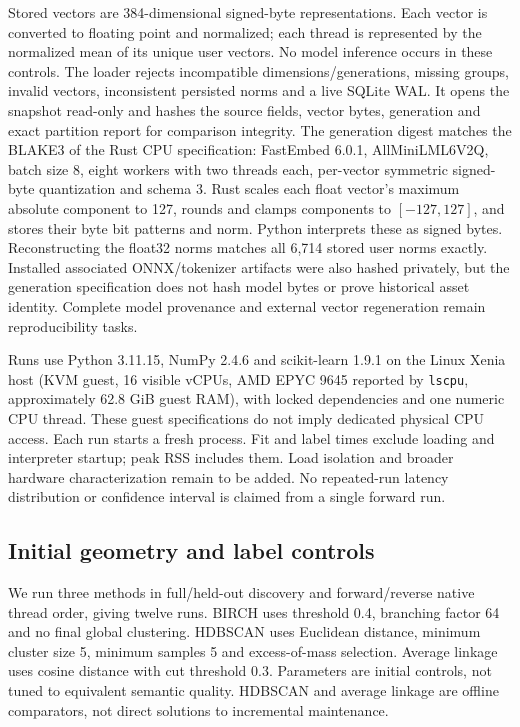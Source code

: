 \documentclass[11pt]{article}
\begin{document}
Stored vectors are 384-dimensional signed-byte representations. Each vector is
converted to floating point and normalized; each thread is represented by the
normalized mean of its unique user vectors. No model inference occurs in these
controls. The loader rejects incompatible dimensions/generations, missing groups,
invalid vectors, inconsistent persisted norms and a live SQLite WAL. It opens the snapshot read-only and hashes
the source fields, vector bytes, generation and exact partition report for
comparison integrity. The generation digest matches the BLAKE3 of the Rust CPU
specification: FastEmbed 6.0.1, AllMiniLML6V2Q, batch size 8, eight workers with
two threads each, per-vector symmetric signed-byte quantization and schema 3.
Rust scales each float vector's maximum absolute component to 127, rounds and
clamps components to $[-127,127]$, and stores their byte bit patterns and norm.
Python interprets these as signed bytes. Reconstructing the float32 norms matches
all 6,714 stored user norms exactly. Installed associated ONNX/tokenizer artifacts
were also hashed privately, but the generation specification does not hash model
bytes or prove historical asset identity. Complete model provenance and external
vector regeneration remain reproducibility tasks.

Runs use Python 3.11.15, NumPy 2.4.6 and scikit-learn 1.9.1 on the Linux Xenia
host (KVM guest, 16 visible vCPUs, AMD EPYC 9645 reported by \texttt{lscpu},
approximately 62.8 GiB guest RAM), with locked dependencies and one numeric CPU
thread. These guest specifications do not imply dedicated physical CPU access.
Each run starts a
fresh process. Fit and label times exclude loading and interpreter startup;
peak RSS includes them. Load isolation and broader hardware characterization remain
to be added. No repeated-run latency distribution or confidence interval is
claimed from a single forward run.

\subsection{Initial geometry and label controls}
We run three methods in full/held-out discovery and forward/reverse native
thread order, giving twelve runs. BIRCH uses threshold 0.4, branching factor 64
and no final global clustering. HDBSCAN uses Euclidean distance, minimum cluster
size 5, minimum samples 5 and excess-of-mass selection. Average linkage uses
cosine distance with cut threshold 0.3. Parameters are initial controls, not
tuned to equivalent semantic quality. HDBSCAN and average linkage are offline
comparators, not direct solutions to incremental maintenance.
\end{document}
